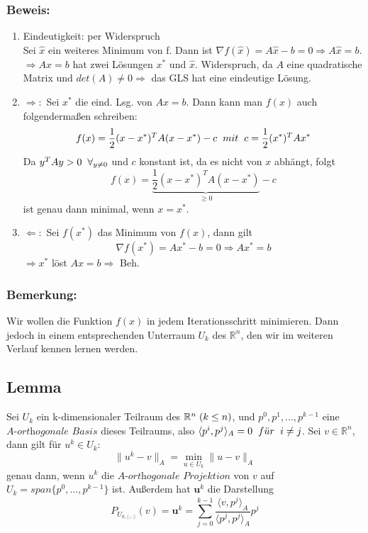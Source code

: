 \documentclass{article}
\begin{document}
\subsubsection{Beweis:}
\begin{enumerate}
\item Eindeutigkeit: per Widerspruch
\\Sei $\hat x$ ein weiteres Minimum von f. Dann ist $\nabla f(\hat x) = A\hat x - b = 0 \Rightarrow A\hat x = b$.
\\$\Rightarrow Ax = b$ hat zwei Lösungen $x^{*}$ und $\hat x$. Widerspruch, da $A$ eine quadratische Matrix und $det(A) \ne 0 \Rightarrow $ das GLS hat eine eindeutige Lösung.
\item $\Rightarrow:$ Sei $x^{*}$ die eind. Lsg. von $Ax = b$. Dann kann man $f(x)$ auch folgenderma{\ss}en schreiben:
$$f(x) = \frac 1 2 (x - x^{*})^{T}A(x - x^{*}) - c \hspace{2mm} mit \hspace{2mm} c = \frac 1 2 (x^{*})^{T}Ax^{*}$$
Da $y^{T}Ay > 0 \hspace{2mm} \forall _{y \ne 0}$ und $c$ konstant ist, da es nicht von $x$ abhängt, folgt
$$f(x) = \underbrace {\frac 1 2 (x - x^{*})^{T}A(x - x^{*})}_{\ge 0} - c$$
ist genau dann minimal, wenn $x = x^{*}$.
\item $\Leftarrow:$ Sei $f(x^{*})$ das Minimum von $f(x)$, dann gilt
$$\nabla f(x^{*}) = Ax^{*} - b = 0 \Rightarrow Ax^{*} = b$$
$\Rightarrow x^{*}$ löst $Ax = b \Rightarrow$ Beh.
\end{enumerate}

\subsubsection{Bemerkung:}
Wir wollen die Funktion $f(x)$ in jedem Iterationsschritt minimieren. Dann jedoch in einem entsprechenden Unterraum $U_{k}$ des $\mathbb{R}^{n}$, den wir im weiteren Verlauf kennen lernen werden.

\subsection{Lemma}
Sei $U_{k}$ ein k-dimensionaler Teilraum des $\mathbb{R}^{n} \hspace{1mm} (k \le n)$, und $p^{0}, p^{1},...,p^{k-1}$ eine $\textit{A-orthogonale Basis}$ dieses Teilraums, also $\langle p^{i}, p^{j} \rangle _{A} = 0 \hspace{2mm} f\ddot{u}r \hspace{2mm} i \ne j$. Sei $v \in \mathbb{R}^{n}$, dann gilt für $u^{k} \in U_{k}$:
\begin{equation}
\|u^{k} - v\|_{A} = \underset{u \in U_{k}}{\min} \|u - v\|_{A}
\end{equation}
genau dann, wenn $u^{k}$ die $\textit{A-orthogonale Projektion}$ von $v$ auf $U_{k} = span\{p^{0},...,p^{k-1}\}$ ist. Außerdem hat $\textbf{u}^{k}$ die Darstellung
\begin{equation}
P_{U_{k,\langle \cdot,\cdot \rangle}}(v) = \textbf{u}^{k} = \sum_{j=0}^{k-1} \frac {\langle v, p^{j} \rangle _{A}} {\langle p^{j}, p^{j} \rangle _{A}} p^{j}
\end{equation}
\end{document}
